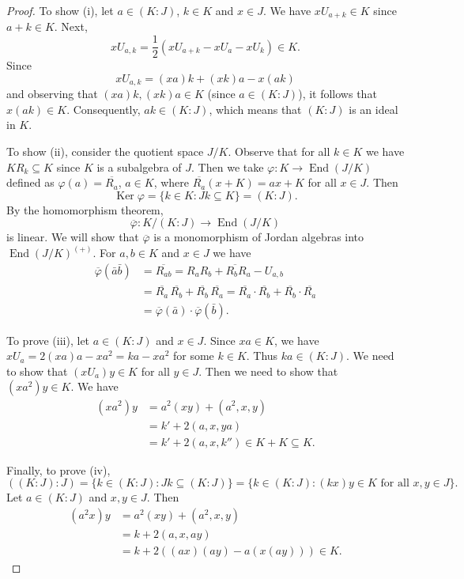 \documentclass{article}
\begin{document}
\begin{proof}
To show (i), let $a\in(K:J)$, $k\in K$ and $x\in J$. We have $xU_{a+k}\in K$ since $a+k\in K$. Next,
\[
xU_{a,k}=\frac{1}{2}\left(xU_{a+k}-xU_a-xU_k\right)\in K.
\]
Since
\[
xU_{a,k}=(xa)k+(xk)a-x(ak)
\]
and observing that $(xa)k,(xk)a\in K$ (since $a\in(K:J)$), it follows that $x(ak)\in K$. Consequently, $ak\in(K:J)$, which means that $(K:J)$ is an ideal in $K$.

To show (ii), consider the quotient space $J/K$. Observe that for all $k\in K$ we have $KR_k\subseteq K$ since $K$ is a subalgebra of $J$. Then we take $\varphi:K\to\operatorname{End}(J/K)$ defined as $\varphi(a)=\overline{R_a}$, $a\in K$, where $\overline{R_a}(x+K)=ax+K$ for all $x\in J$. Then
\[
\operatorname{Ker}\varphi=\{k\in K:Jk\subseteq K\}=(K:J).
\]
By the homomorphism theorem,
\[
\overline{\varphi}:K/(K:J)\to\operatorname{End}(J/K)
\]
is linear. We will show that $\overline{\varphi}$ is a monomorphism of Jordan algebras into $\operatorname{End}(J/K)^{(+)}$. For $a,b\in K$ and $x\in J$ we have
\begin{align*}
\overline{\varphi}(\bar{a}\bar{b})&=\overline{R_{ab}}=\overline{R_aR_b+R_bR_a-U_{a,b}}\\
&=\overline{R_a}\,\overline{R_b}+\overline{R_b}\,\overline{R_a}=\overline{R_a}\cdot\overline{R_b}+\overline{R_b}\cdot\overline{R_a}\\
&=\overline{\varphi}(\bar{a})\cdot\overline{\varphi}(\bar{b}).
\end{align*}

To prove (iii), let $a\in(K:J)$ and $x\in J$. Since $xa\in K$, we have $xU_a=2(xa)a-xa^2=ka-xa^2$ for some $k\in K$. Thus $ka\in(K:J)$. We need to show that $(xU_a)y\in K$ for all $y\in J$. Then we need to show that $(xa^2)y\in K$. We have
\begin{align*}
(xa^2)y&=a^2(xy)+(a^2,x,y)\\
&=k'+2(a,x,ya)\\
&=k'+2(a,x,k'')\in K+K\subseteq K.
\end{align*}

Finally, to prove (iv),
\[
((K:J):J)=\{k\in(K:J):Jk\subseteq(K:J)\}=\{k\in(K:J):(kx)y\in K\text{ for all }x,y\in J\}.
\]
Let $a\in(K:J)$ and $x,y\in J$. Then
\begin{align*}
(a^2x)y&=a^2(xy)+(a^2,x,y)\\
&=k+2(a,x,ay)\\
&=k+2((ax)(ay)-a(x(ay)))\in K.
\end{align*}
\end{proof}
\end{document}
